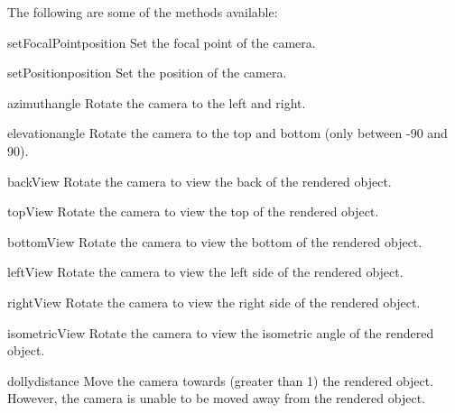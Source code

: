 The following are some of the methods available:
\begin{methoddesc}[Camera]{setFocalPoint}{position}
Set the focal point of the camera.
\end{methoddesc}

\begin{methoddesc}[Camera]{setPosition}{position}
Set the position of the camera.
\end{methoddesc}

\begin{methoddesc}[Camera]{azimuth}{angle}
Rotate the camera to the left and right.
\end{methoddesc}

\begin{methoddesc}[Camera]{elevation}{angle}
Rotate the camera to the top and bottom (only between -90 and 90).
\end{methoddesc}

\begin{methoddesc}[Camera]{backView}{}
Rotate the camera to view the back of the rendered object.
\end{methoddesc}

\begin{methoddesc}[Camera]{topView}{}
Rotate the camera to view the top of the rendered object.
\end{methoddesc}

\begin{methoddesc}[Camera]{bottomView}{}
Rotate the camera to view the bottom of the rendered object.
\end{methoddesc}

\begin{methoddesc}[Camera]{leftView}{}
Rotate the camera to view the left side of the rendered object.
\end{methoddesc}

\begin{methoddesc}[Camera]{rightView}{}
Rotate the camera to view the right side of the rendered object.
\end{methoddesc}

\begin{methoddesc}[Camera]{isometricView}{}
Rotate the camera to view the isometric angle of the rendered object.
\end{methoddesc}

\begin{methoddesc}[Camera]{dolly}{distance}
Move the camera towards (greater than 1) the rendered object. However,
the camera is unable to be moved away from the rendered object.
\end{methoddesc}

